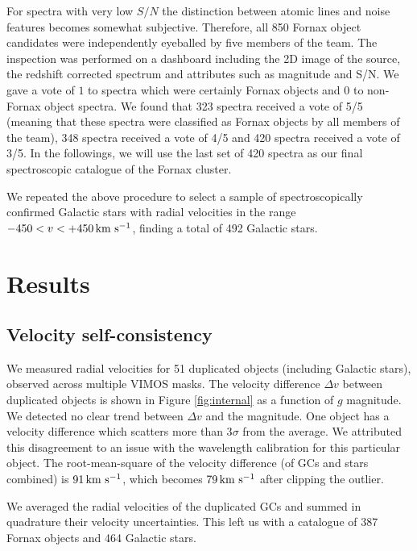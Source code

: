 \documentclass[useAMS,usenatbib]{mn2e}
\newcommand{\kms}{\mbox{\,km~s$^{-1}$}}
\begin{document}
For spectra with very low $S/N$ the distinction between atomic lines and noise features becomes somewhat subjective. Therefore, all 850 Fornax object candidates were independently eyeballed by five members of the team. The inspection was performed on a dashboard including the 2D image of the source, the redshift corrected spectrum and attributes such as magnitude and S/N. We gave a vote of $1$ to spectra which were certainly Fornax objects and $0$ to non-Fornax object spectra. We found that 323 spectra received a vote of 5/5 (meaning that these spectra were classified as Fornax objects by all members of the team), 348 spectra received a vote of 4/5 and 420 spectra received a vote of 3/5. In the followings, we will use the last set of 420 spectra as our final spectroscopic catalogue of the Fornax cluster. 

We repeated the above procedure to select a sample of spectroscopically confirmed Galactic stars with radial velocities in the range $-450<v<+450 \kms$, finding a total of 492 Galactic stars.

\section{Results}
\label{sec:analysis}
\subsection{Velocity self-consistency}

We measured radial velocities for 51 duplicated objects (including Galactic stars), observed across multiple VIMOS masks. The velocity difference $\Delta v$ between duplicated objects is shown in Figure \ref{fig:internal} as a function of $g$ magnitude. We detected no clear trend between $\Delta v$ and the magnitude. One object has a velocity difference which scatters more than 3$\sigma$ from the average. We attributed this disagreement to an issue with the wavelength calibration for this particular object. The root-mean-square of the velocity difference (of GCs and stars combined) is $91 \kms$, which becomes $79\kms$ after clipping the outlier. 

We averaged the radial velocities of the duplicated GCs and summed in quadrature their velocity uncertainties. This left us with a catalogue of 387 Fornax objects and 464 Galactic stars.
\end{document}
